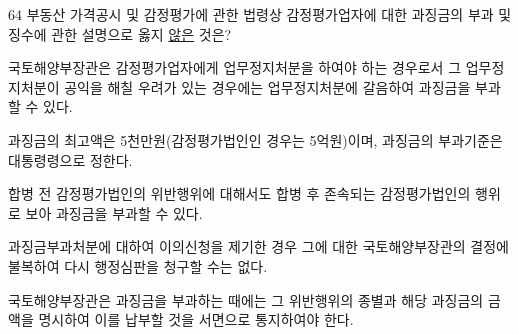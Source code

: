 \begin{question}{64}
부동산 가격공시 및 감정평가에 관한 법령상 감정평가업자에 대한 과징금의 부과 및 징수에 관한 설명으로 옳지 \uline{않은} 것은?
\begin{choices}
  \item 국토해양부장관은 감정평가업자에게 업무정지처분을 하여야 하는 경우로서 그 업무정지처분이 공익을 해칠 우려가 있는 경우에는 업무정지처분에 갈음하여 과징금을 부과할 수 있다.
  \item 과징금의 최고액은 5천만원(감정평가법인인 경우는 5억원)이며, 과징금의 부과기준은 대통령령으로 정한다.
  \item 합병 전 감정평가법인의 위반행위에 대해서도 합병 후 존속되는 감정평가법인의 행위로 보아 과징금을 부과할 수 있다.
  \item 과징금부과처분에 대하여 이의신청을 제기한 경우 그에 대한 국토해양부장관의 결정에 불복하여 다시 행정심판을 청구할 수는 없다.
  \item 국토해양부장관은 과징금을 부과하는 때에는 그 위반행위의 종별과 해당 과징금의 금액을 명시하여 이를 납부할 것을 서면으로 통지하여야 한다.
\end{choices}
\end{question}
